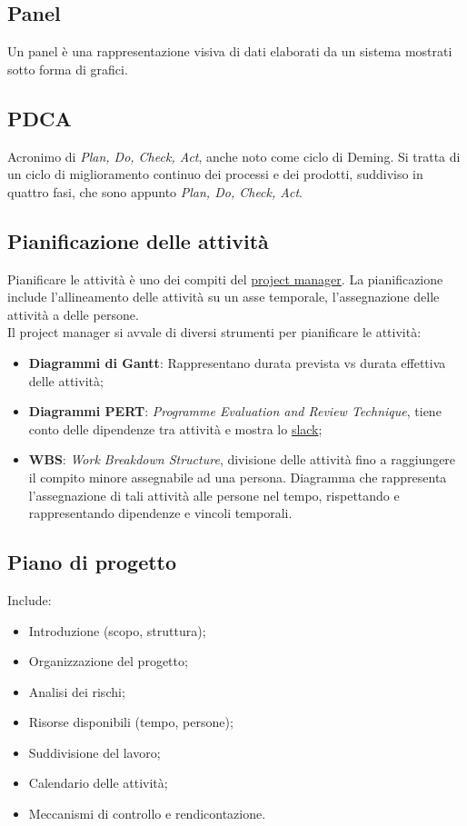 	\subsection{Panel}
	\label{sec:panel}
	Un panel è una rappresentazione visiva di dati elaborati da un sistema mostrati sotto forma di grafici.


	\subsection{PDCA}
	\label{sec:pdca}
	Acronimo di \emph{Plan, Do, Check, Act}, anche noto come ciclo di Deming. Si tratta di un ciclo di miglioramento continuo dei processi e dei prodotti, suddiviso in quattro fasi, che sono appunto \emph{Plan, Do, Check, Act}.


	\subsection{Pianificazione delle attività}
	\label{sec:pianificazioneattivita}
	Pianificare le attività è uno dei compiti del \underline{\hyperref[sec:projectmanager]{project manager}}.
	La pianificazione include l'allineamento delle attività su un asse temporale, l'assegnazione delle attività a delle persone. \\Il project manager si avvale di diversi strumenti per pianificare le attività:
	\begin{itemize}
	\item \textbf{Diagrammi di Gantt}: Rappresentano durata prevista vs durata effettiva delle attività;
	\item \textbf{Diagrammi PERT}: \emph{Programme Evaluation and Review Technique}, tiene conto delle dipendenze tra attività e mostra lo \hyperref[sec:slack]{slack};
	\item \textbf{WBS}: \emph{Work Breakdown Structure}, divisione delle attività fino a raggiungere il compito minore assegnabile ad una persona. Diagramma che rappresenta l'assegnazione di tali attività alle persone nel tempo, rispettando e rappresentando dipendenze e vincoli temporali.
	\end{itemize}


	\subsection{Piano di progetto}
	\label{sec:pianoprogetto}
	Include:
	\begin{itemize}
	\item Introduzione (scopo, struttura);
	\item Organizzazione del progetto;
	\item Analisi dei rischi;
	\item Risorse disponibili (tempo, persone);
	\item Suddivisione del lavoro;
	\item Calendario delle attività;
	\item Meccanismi di controllo e rendicontazione.
	\end{itemize}


